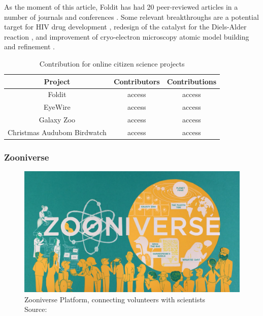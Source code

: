 As the moment of this article, Foldit has had 20 peer-reviewed articles in a number of journals and conferences \cite{foldit-publications}. Some relevant breakthroughs are a potential target for HIV drug development \cite{khatib2011crystal}, redesign of the catalyst for the Diels-Alder reaction \cite{eiben2012increased}, and improvement of cryo-electron microscopy atomic model building and refinement \cite{khatib2019building}.

\begin{table}[h]
    \centering
    \begin{tabular}{|c|c|c|}
        \hline Project & Contributors & Contributions \\
        \hline Foldit & access & access \\ 
        \hline EyeWire & access & access \\ 
        \hline Galaxy Zoo & access & access \\ 
        \hline Christmas Audubom Birdwatch & access & access \\ \hline 
    \end{tabular}
    \caption{Contribution for online citizen science projects}
    \label{tab:cs-contributions}
\end{table}

\subsubsection{Zooniverse}

\begin{figure}[ht]
    \centering
    \includegraphics[width=\linewidth]{images/background/zooniverse.jpg}
    \caption{Zooniverse Platform, connecting volunteers with scientists \\ Source: \cite{zooniverse-logo}}
    \label{fig:foldit-solution}
\end{figure}

